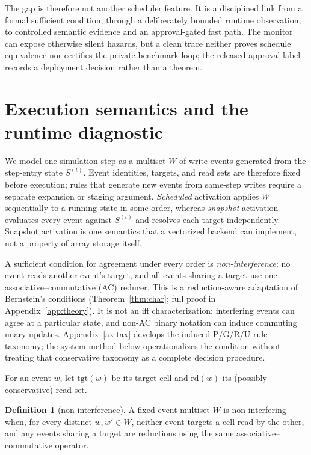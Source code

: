 \documentclass[sigconf,nonacm,review,natbib=true]{acmart}
\theoremstyle{definition}
\newtheorem{definition}{Definition}
\theoremstyle{plain}
\theoremstyle{remark}
\begin{document}
The gap is therefore not another scheduler feature. It is a disciplined link
from a formal sufficient condition, through a deliberately bounded runtime
observation, to controlled semantic evidence and an approval-gated fast path.
The monitor can expose otherwise silent hazards, but a clean trace neither
proves schedule equivalence nor certifies the private benchmark loop; the
released approval label records a deployment decision rather than a theorem.


\section{Execution semantics and the runtime diagnostic}
\label{sec:theory}

We model one simulation step as a multiset $W$ of write events generated from
the step-entry state $S^{(t)}$. Event identities, targets, and read sets are
therefore fixed before execution; rules that generate new events from same-step
writes require a separate expansion or staging argument. \emph{Scheduled}
activation applies $W$ sequentially to a running state in some order, whereas
\emph{snapshot} activation evaluates every event against $S^{(t)}$ and resolves
each target independently. Snapshot activation is one semantics that a
vectorized backend can implement, not a property of array storage itself.

A sufficient condition for agreement under every order is
\emph{non-interference}: no event reads another event's target, and all events
sharing a target use one associative--commutative (AC) reducer. This is a
reduction-aware adaptation of Bernstein's conditions (Theorem~\ref{thm:char};
full proof in Appendix~\ref{app:theory}). It is not an iff characterization:
interfering events can agree at a particular state, and non-AC binary notation
can induce commuting unary updates. Appendix~\ref{ax:tax} develops the induced
P/G/R/U rule taxonomy; the system method below operationalizes the condition
without treating that conservative taxonomy as a complete decision procedure.

For an event $w$, let $\mathrm{tgt}(w)$ be its target cell and
$\mathrm{rd}(w)$ its (possibly conservative) read set.

\begin{definition}[non-interference]\label{def:noninterference}
A fixed event multiset $W$ is non-interfering when, for every distinct
$w,w'\in W$, neither event targets a cell read by the other, and any events
sharing a target are reductions using the same associative--commutative
operator.
\end{definition}
\end{document}
